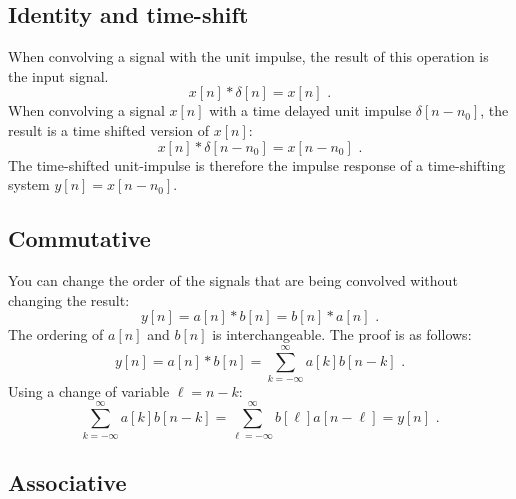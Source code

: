 \subsection{Identity and time-shift}

When convolving a signal with the unit impulse, the result of this
operation is the input signal.
\begin{equation}
x[n]*\delta[n]=x[n]\,\,.
\end{equation}
When convolving a signal $x[n]$ with a time delayed unit impulse $\delta[n-n_0]$, the result is a time shifted version of $x[n]$:
\begin{equation}
x[n]*\delta[n-n_0]=x[n-n_0]\,\,.
\end{equation}
The time-shifted unit-impulse is therefore the impulse response of a
time-shifting system $y[n] = x[n-n_0]$.

\subsection{Commutative}

You can change the order of the signals that are being convolved without changing the result: 
\begin{equation}
y[n] = a[n]*b[n] = b[n]*a[n]\,\,.
\end{equation}
The ordering of $a[n]$ and $b[n]$ is interchangeable. The proof is as follows:
\begin{equation}
y[n] = a[n]*b[n] = \sum_{k=-\infty}^{\infty} a[k]b[n-k]\,\,. 
\end{equation}
Using a change of variable $\ell=n-k$:
\begin{equation}
  \sum_{k=-\infty}^{\infty} a[k]b[n-k] = \sum_{\ell=-\infty}^{\infty} b[\ell] a[n-\ell] = y[n]\,\,.
  \label{eq:commutative_convolution_proof}
\end{equation}

\subsection{Associative}

